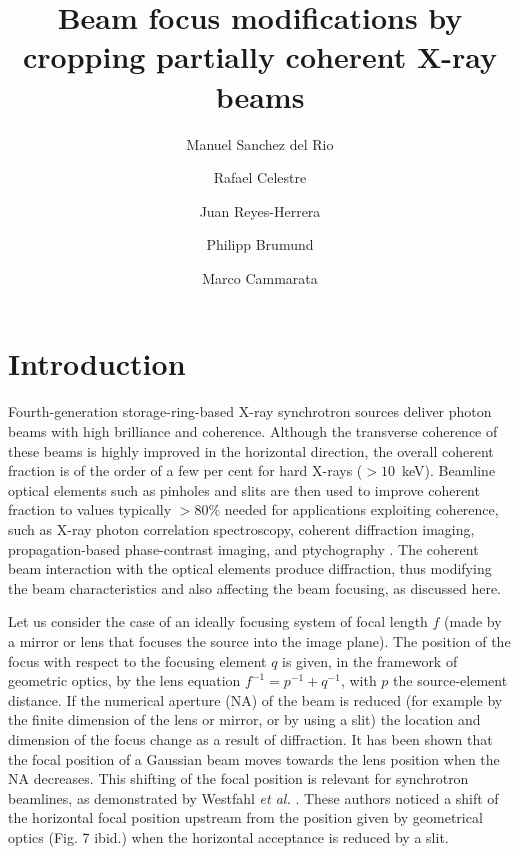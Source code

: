 \documentclass[doublecol]{epl2}
\title{Beam focus modifications by cropping partially coherent X-ray beams}
\author{Manuel Sanchez del Rio\inst{1} \and Rafael Celestre\inst{1} \and Juan Reyes-Herrera\inst{1} \and Philipp Brumund\inst{1} \and Marco Cammarata\inst{1}}
\institute{                    
  \inst{1} European Synchrotron Radiation Facility, 71 Avenue des Martyrs, 38000 Grenoble, France
}
\begin{document}

\maketitle



\section{Introduction}
\label{sec:introduction}
Fourth-generation storage-ring-based X-ray synchrotron sources deliver photon beams with high brilliance and coherence. Although the transverse coherence of these beams is highly improved in the horizontal direction, 
the overall coherent fraction is of the order of a few per cent for hard X-rays ($>10$~keV). Beamline optical elements such as pinholes and slits are then used to improve coherent fraction to values typically $>80 \%$ needed for applications exploiting coherence, such as X-ray photon correlation spectroscopy, coherent diffraction imaging, propagation-based phase-contrast imaging, and ptychography \cite{paganin_book}. The coherent beam interaction with the optical elements produce diffraction, thus modifying the beam characteristics and also affecting the beam focusing, as discussed here.

Let us consider the case of an ideally focusing system of focal length $f$ (made by a mirror or lens that focuses the source into the image plane). The position of the focus with respect to the focusing element $q$ is given, in the framework of geometric optics, by the lens equation $f^{-1}=p^{-1}+q^{-1}$, with $p$ the source-element distance. If the numerical aperture (NA) of the beam is reduced (for example by the finite dimension of the lens or mirror, or by using a slit) the location and dimension of the focus change as a result of diffraction. It has been shown \cite{Tanaka:85} that the focal position of a Gaussian beam moves towards the lens position when the NA decreases. This shifting of the focal position is relevant for synchrotron beamlines, as demonstrated by Westfahl {\it et al.} \cite{westfahl}. These authors noticed a shift of the horizontal focal position upstream from the position given by geometrical optics (Fig. 7 ibid.) when the horizontal acceptance is reduced by a slit. 
\end{document}
